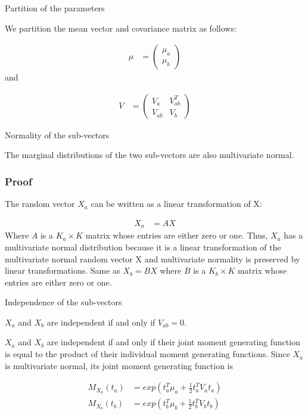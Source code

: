 \documentclass[11pt]{article} %
\begin{document}
Partition of the parameters

We partition the mean vector and covariance matrix as follows:

\begin{align*}
	\mu &= \begin{pmatrix}
		\mu_a \\
		\mu_b
	\end{pmatrix}
\end{align*}
and 

\begin{align*}
	V &= \begin{pmatrix}
		V_a & V_{ab}^T \\
		V_{ab} & V_b
	\end{pmatrix}
\end{align*}

Normality of the sub-vectors

The marginal distributions of the two sub-vectors are also multivariate normal.

\subsubsection{Proof}
The random vector $X_a$ can be written as a linear transformation of X:

\begin{align*}
	X_a &= A X
\end{align*}
Where $A$ is a $K_a \times K$ matrix whose entries are either zero or one. Thus, $X_a $ has a multivariate normal distribution because it is a linear transformation of the multivariate normal random vector X and multivariate normality is preserved by linear transformations. Same as $X_b = B X$ where $B$ is a $K_b \times K$ matrix whose entries are either zero or one. 



Independence of the sub-vectors

$X_a$ and $X_b$ are independent if and only if $V_{ab} = 0$.

$X_a$ and $X_b$ are independent if and only if their joint moment generating function is equal to the product of their individual moment generating functions. Since $X_a$ is multivariate normal, its joint moment generating function is 

\begin{align*}
	M_{X_a}(t_a) &= exp(t^T_a \mu_a + \frac{1}{2} t_a^T V_a t_a) \\
	M_{X_b}(t_b) &= exp(t^T_b \mu_b + \frac{1}{2} t_b^T V_b t_b) 
\end{align*}
\end{document}
